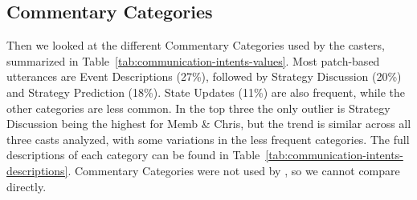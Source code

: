 \subsection{Commentary Categories}
Then we looked at the different Commentary Categories used by the casters, summarized in Table~\ref{tab:communication-intents-values}. Most patch-based utterances are Event Descriptions (27\%), followed by Strategy Discussion (20\%) and Strategy Prediction (18\%). State Updates (11\%) are also frequent, while the other categories are less common. In the top three the only outlier is Strategy Discussion being the highest for Memb \& Chris, but the trend is similar across all three casts analyzed, with some variations in the less frequent categories. The full descriptions of each category can be found in Table~\ref{tab:communication-intents-descriptions}. Commentary Categories were not used by \citet{dodge2018}, so we cannot compare directly.

